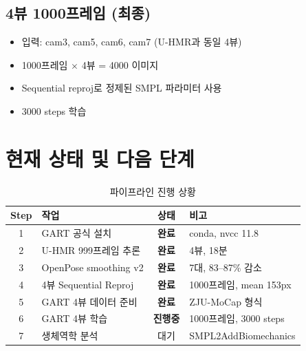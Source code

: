 \documentclass[11pt, a4paper]{report}
\begin{document}
\section{4뷰 1000프레임 (최종)}

\begin{itemize}[leftmargin=*]
  \item 입력: cam3, cam5, cam6, cam7 (U-HMR과 동일 4뷰)
  \item 1000프레임 $\times$ 4뷰 = 4000 이미지
  \item Sequential reproj로 정제된 SMPL 파라미터 사용
  \item 3000 steps 학습
\end{itemize}


\chapter{현재 상태 및 다음 단계}

\begin{table}[H]
\centering
\caption{파이프라인 진행 상황}
\renewcommand{\arraystretch}{1.4}
\begin{tabular}{c p{5cm} c p{4cm}}
\toprule
\textbf{Step} & \textbf{작업} & \textbf{상태} & \textbf{비고} \\
\midrule
1 & GART 공식 설치 & \textbf{완료} & conda, nvcc 11.8 \\
2 & U-HMR 999프레임 추론 & \textbf{완료} & 4뷰, 18분 \\
3 & OpenPose smoothing v2 & \textbf{완료} & 7대, 83--87\% 감소 \\
4 & 4뷰 Sequential Reproj & \textbf{완료} & 1000프레임, mean 153px \\
5 & GART 4뷰 데이터 준비 & \textbf{완료} & ZJU-MoCap 형식 \\
6 & GART 4뷰 학습 & \textbf{진행중} & 1000프레임, 3000 steps \\
7 & 생체역학 분석 & 대기 & SMPL2AddBiomechanics \\
\bottomrule
\end{tabular}
\end{table}
\end{document}
